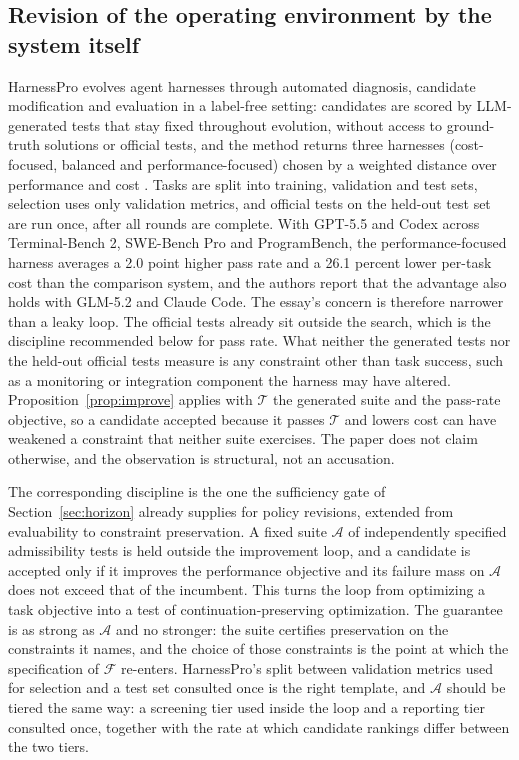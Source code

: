 \documentclass[11pt]{article}
\theoremstyle{definition}
\theoremstyle{remark}
\begin{document}
\subsection{Revision of the operating environment by the system itself}

HarnessPro evolves agent harnesses through automated diagnosis, candidate modification and evaluation in a label-free setting: candidates are scored by LLM-generated tests that stay fixed throughout evolution, without access to ground-truth solutions or official tests, and the method returns three harnesses (cost-focused, balanced and performance-focused) chosen by a weighted distance over performance and cost \cite{harnesspro}. Tasks are split into training, validation and test sets, selection uses only validation metrics, and official tests on the held-out test set are run once, after all rounds are complete. With GPT-5.5 and Codex across Terminal-Bench 2, SWE-Bench Pro and ProgramBench, the performance-focused harness averages a 2.0 point higher pass rate and a 26.1 percent lower per-task cost than the comparison system, and the authors report that the advantage also holds with GLM-5.2 and Claude Code. The essay's concern is therefore narrower than a leaky loop. The official tests already sit outside the search, which is the discipline recommended below for pass rate. What neither the generated tests nor the held-out official tests measure is any constraint other than task success, such as a monitoring or integration component the harness may have altered. Proposition~\ref{prop:improve} applies with $\mathcal{T}$ the generated suite and the pass-rate objective, so a candidate accepted because it passes $\mathcal{T}$ and lowers cost can have weakened a constraint that neither suite exercises. The paper does not claim otherwise, and the observation is structural, not an accusation.

The corresponding discipline is the one the sufficiency gate of Section~\ref{sec:horizon} already supplies for policy revisions, extended from evaluability to constraint preservation. A fixed suite $\mathcal{A}$ of independently specified admissibility tests is held outside the improvement loop, and a candidate is accepted only if it improves the performance objective and its failure mass on $\mathcal{A}$ does not exceed that of the incumbent. This turns the loop from optimizing a task objective into a test of continuation-preserving optimization. The guarantee is as strong as $\mathcal{A}$ and no stronger: the suite certifies preservation on the constraints it names, and the choice of those constraints is the point at which the specification of $\mathcal{F}$ re-enters. HarnessPro's split between validation metrics used for selection and a test set consulted once is the right template, and $\mathcal{A}$ should be tiered the same way: a screening tier used inside the loop and a reporting tier consulted once, together with the rate at which candidate rankings differ between the two tiers.
\end{document}
